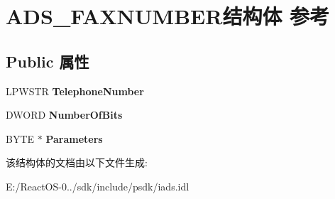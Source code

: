 \hypertarget{struct_a_d_s___f_a_x_n_u_m_b_e_r}{}\section{A\+D\+S\+\_\+\+F\+A\+X\+N\+U\+M\+B\+E\+R结构体 参考}
\label{struct_a_d_s___f_a_x_n_u_m_b_e_r}
\subsection*{Public 属性}
\begin{DoxyCompactItemize}
\item 
\mbox{\label{struct_a_d_s___f_a_x_n_u_m_b_e_r_a37d5907f1acd1ac34118af0180941333}} 
L\+P\+W\+S\+TR {\bfseries Telephone\+Number}
\item 
\mbox{\label{struct_a_d_s___f_a_x_n_u_m_b_e_r_a4514e64d112867b569b3b7ab88dae465}} 
D\+W\+O\+RD {\bfseries Number\+Of\+Bits}
\item 
\mbox{\label{struct_a_d_s___f_a_x_n_u_m_b_e_r_ac0abf1d7acb2695f962ca6d8c89cc7b9}} 
B\+Y\+TE $\ast$ {\bfseries Parameters}
\end{DoxyCompactItemize}


该结构体的文档由以下文件生成\+:\begin{DoxyCompactItemize}
\item 
E\+:/\+React\+O\+S-\/0../sdk/include/psdk/iads.\+idl\end{DoxyCompactItemize}
